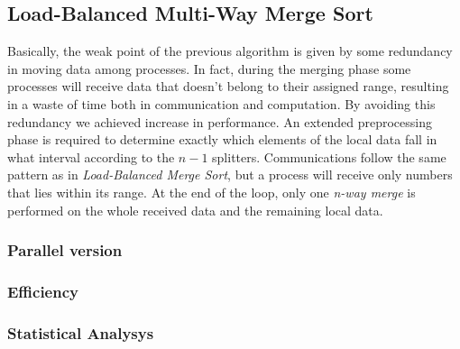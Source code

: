 \subsection{Load-Balanced Multi-Way Merge Sort}
Basically, the weak point of the previous algorithm is given by some redundancy in moving data among processes. In fact, during the merging phase some processes will receive data that doesn't belong to their assigned range, resulting in a waste of time both in communication and computation. By avoiding this redundancy we achieved increase in performance. An extended preprocessing phase is required to determine exactly which elements of the local data fall in what interval according to the $n-1$ splitters. Communications follow the same pattern as in \textit{Load-Balanced Merge Sort}, but a process will receive only numbers that lies within its range. At the end of the loop, only one \textit{n-way merge} is performed on the whole received data and the remaining local data.



\subsubsection*{Parallel version}
\subsubsection*{Efficiency} 
\subsubsection*{Statistical Analysys}

